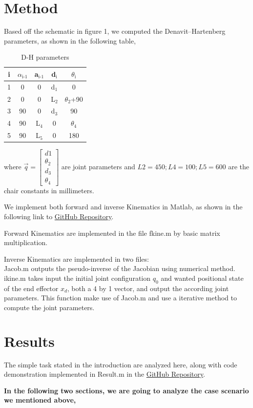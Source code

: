 \documentclass[12pt, letterpaper]{amsart} %
\numberwithin{equation}{section}
\begin{document}
\section{Method}
Based off the schematic in figure 1, we computed the Denavit–Hartenberg parameters, as shown in the following table,
\begin{table}[H]
  \centering
  \begin{tabular}{c|cccc}
i & $\alpha$$_{\text{i-1}}$ & a$_{\text{i-1}}$ & d$_{\text{i}}$ & $\theta$$_{\text{i}}$\\
\hline
1 & 0 & 0 & d$_{\text{1}}$ & 0\\
2 & 0 & 0 & L$_{\text{2}}$ & $\theta_2$+90\\
3 & 90 & 0 & d$_{\text{3}}$ & 90\\
4 & 90 & L$_{\text{4}}$ & 0 & $\theta$$_{\text{4}}$\\
5 & 90 & L$_{\text{5}}$ & 0 & 180\\
\end{tabular}
  \caption{D-H parameters}
\end{table}
where $\vec{q} =
\begin{bmatrix}
  d1 \\ \theta_2 \\ d_3 \\ \theta_4
\end{bmatrix}
$ are joint parameters and $L2 = 450; L4 = 100; L5 = 600$ are the chair constants in millimeters.
\par
We implement both forward and inverse Kinematics in Matlab, as shown in the following link to  \href{https://github.com/ckwojai/EE183_LAB/tree/master/lab1/code}{GitHub Repository}. \par
Forward Kinematics are implemented in the file fkine.m by basic matrix multiplication. \par
Inverse Kinematics are implemented in two files: \\
Jacob.m outputs the pseudo-inverse of the Jacobian using numerical method. \\
ikine.m takes input the initial joint configuration $q_0$ and wanted positional state of the end effector $x_d$, both a 4 by 1 vector, and output the according joint parameters. This function make use of Jacob.m and use a iterative method to compute the joint parameters.

\section{Results}
The simple task stated in the introduction are analyzed here, along with code demonstration implemented in Result.m in the \href{https://github.com/ckwojai/EE183_LAB/tree/master/lab1/code}{GitHub Repository}. \par
\textbf{In the following two sections, we are going to analyze the case scenario we mentioned above,}
\end{document}
